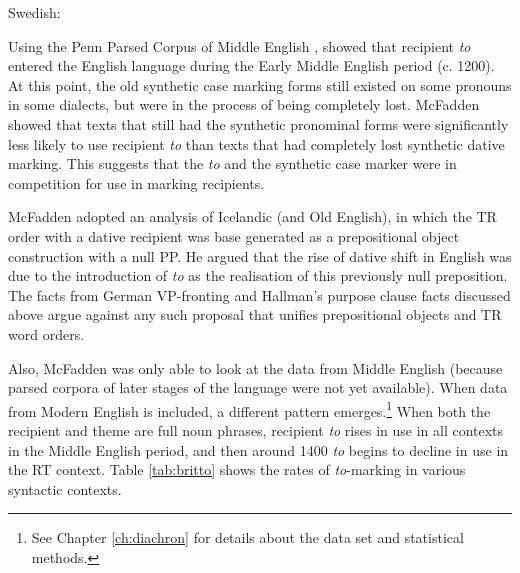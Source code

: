 		\begin{exe}
			\ex Swedish:\label{ex:Swedish-complex-act}
			\begin{xlist}
			\end{xlist}
		\end{exe}
		Using the Penn Parsed Corpus of Middle English \citep{Kroch.2000}, \cite{McFadden.2002} showed that recipient \textit{to} entered the English language during the Early Middle English period (c. 1200). At this point, the old synthetic case marking forms still existed on some pronouns in some dialects, but were in the process of being completely lost. McFadden showed that texts that still had the synthetic pronominal forms were significantly less likely to use recipient \textit{to} than texts that had completely lost synthetic dative marking. This suggests that the \textit{to} and the synthetic case marker were in competition for use in marking recipients.

		McFadden adopted an analysis of Icelandic (and Old English), in which the TR order with a dative recipient was base generated as a prepositional object construction with a null PP. He argued that the rise of dative shift in English was due to the introduction of \textit{to} as the realisation of this previously null preposition. The facts from German VP-fronting and Hallman's purpose clause facts discussed above argue against any such proposal that unifies prepositional objects and TR word orders.

		Also, McFadden was only able to look at the data from Middle English (because parsed corpora of later stages of the language were not yet available). When data from Modern English \citep{Kroch.2004,Kroch.2010,Taylor.2006} is included, a different pattern emerges.\footnote{See Chapter \ref{ch:diachron} for details about the data set and statistical methods.} When both the recipient and theme are full noun phrases, recipient \textit{to} rises in use in all contexts in the Middle English period, and then around 1400 \textit{to} begins to decline in use in the RT context. Table \ref{tab:britto} shows the rates of \textit{to}-marking in various syntactic contexts.

